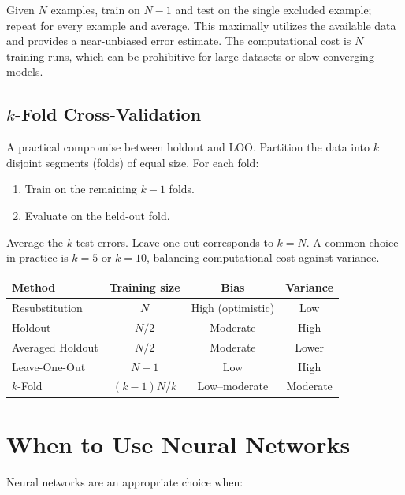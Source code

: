 \documentclass[11pt,a4paper]{article}
\theoremstyle{definition}
\theoremstyle{plain}
\theoremstyle{remark}
\begin{document}
Given $N$ examples, train on $N-1$ and test on the single excluded example; repeat for every example and average. This maximally utilizes the available data and provides a near-unbiased error estimate. The computational cost is $N$ training runs, which can be prohibitive for large datasets or slow-converging models.

\subsection{$k$-Fold Cross-Validation}

A practical compromise between holdout and LOO. Partition the data into $k$ disjoint segments (folds) of equal size. For each fold:
\begin{enumerate}
    \item Train on the remaining $k-1$ folds.
    \item Evaluate on the held-out fold.
\end{enumerate}
Average the $k$ test errors. Leave-one-out corresponds to $k = N$. A common choice in practice is $k = 5$ or $k = 10$, balancing computational cost against variance.

\begin{center}
\renewcommand{\arraystretch}{1.3}
\begin{tabular}{lccc}
    \hline
    \textbf{Method} & \textbf{Training size} & \textbf{Bias} & \textbf{Variance} \\
    \hline
    Resubstitution  & $N$       & High (optimistic) & Low \\
    Holdout         & $N/2$     & Moderate          & High \\
    Averaged Holdout & $N/2$   & Moderate          & Lower \\
    Leave-One-Out   & $N-1$     & Low               & High \\
    $k$-Fold        & $(k-1)N/k$ & Low--moderate    & Moderate \\
    \hline
\end{tabular}
\end{center}


\section{When to Use Neural Networks}

Neural networks are an appropriate choice when:
\end{document}
